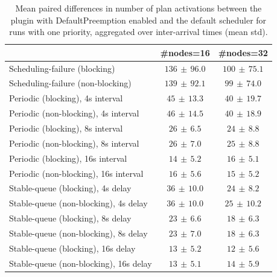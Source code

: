\begin{table}[t]
\tiny
\setlength{\tabcolsep}{1.2pt}
\renewcommand{\arraystretch}{1.12}
\centering
\caption{Mean paired differences in number of plan activations between the plugin with DefaultPreemption enabled and the default scheduler for runs with one priority, aggregated over inter-arrival times (mean \pm std).}
\label{tab:plan_activations-defpreempt1-prio1-std1-agg-arrival}
\begin{tabular}{l c c}
\toprule
 & \#nodes=16 & \#nodes=32 \\
\midrule
Scheduling-failure (blocking) & $136\,\pm\,96.0$ & $100\,\pm\,75.1$ \\
Scheduling-failure (non-blocking) & $139\,\pm\,92.1$ & $99\,\pm\,74.0$ \\
Periodic (blocking), 4s interval & $45\,\pm\,13.3$ & $40\,\pm\,19.7$ \\
Periodic (non-blocking), 4s interval & $46\,\pm\,14.5$ & $40\,\pm\,18.9$ \\
Periodic (blocking), 8s interval & $26\,\pm\,6.5$ & $24\,\pm\,8.8$ \\
Periodic (non-blocking), 8s interval & $26\,\pm\,7.0$ & $25\,\pm\,8.8$ \\
Periodic (blocking), 16s interval & $14\,\pm\,5.2$ & $16\,\pm\,5.1$ \\
Periodic (non-blocking), 16s interval & $16\,\pm\,5.6$ & $15\,\pm\,5.2$ \\
Stable-queue (blocking), 4s delay & $36\,\pm\,10.0$ & $24\,\pm\,8.2$ \\
Stable-queue (non-blocking), 4s delay & $36\,\pm\,10.0$ & $25\,\pm\,10.2$ \\
Stable-queue (blocking), 8s delay & $23\,\pm\,6.6$ & $18\,\pm\,6.3$ \\
Stable-queue (non-blocking), 8s delay & $23\,\pm\,7.0$ & $18\,\pm\,6.3$ \\
Stable-queue (blocking), 16s delay & $13\,\pm\,5.2$ & $12\,\pm\,5.6$ \\
Stable-queue (non-blocking), 16s delay & $13\,\pm\,5.1$ & $14\,\pm\,5.9$ \\
\bottomrule
\end{tabular}
\end{table}

